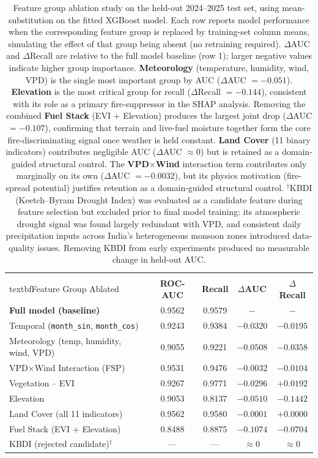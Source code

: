\documentclass[11pt]{article}
\begin{document}
\begin{table}[H]
\centering
\setlength{\tabcolsep}{5pt}
\renewcommand{\arraystretch}{1.25}
\begin{tabular}{lcccc}
\toprule
\\textbf{Feature Group Ablated} & \textbf{ROC-AUC} & \textbf{Recall} & \textbf{$\Delta$AUC} & \textbf{$\Delta$Recall} \\
\midrule
\textbf{Full model (baseline)} & 0.9562 & 0.9579 & $-$ & $-$ \\
Temporal (\texttt{month\_sin}, \texttt{month\_cos}) & 0.9243 & 0.9384 & $-0.0320$ & $-0.0195$ \\
Meteorology (temp, humidity, wind, VPD) & 0.9055 & 0.9221 & $-0.0508$ & $-0.0358$ \\
VPD$\times$Wind Interaction (FSP) & 0.9531 & 0.9476 & $-0.0032$ & $-0.0104$ \\
Vegetation -- EVI & 0.9267 & 0.9771 & $-0.0296$ & $+0.0192$ \\
Elevation & 0.9053 & 0.8137 & $-0.0510$ & $-0.1442$ \\
Land Cover (all 11 indicators) & 0.9562 & 0.9580 & $-0.0001$ & $+0.0000$ \\
Fuel Stack (EVI + Elevation) & 0.8488 & 0.8875 & $-0.1074$ & $-0.0704$ \\
\midrule
KBDI (rejected candidate)$^\dagger$ & --- & --- & $\approx 0$ & $\approx 0$ \\
\bottomrule
\end{tabular}
\caption{Feature group ablation study on the held-out 2024--2025 test set, using mean-substitution on the fitted XGBoost model. Each row reports model performance when the corresponding feature group is replaced by training-set column means, simulating the effect of that group being absent (no retraining required). $\Delta$AUC and $\Delta$Recall are relative to the full model baseline (row 1); larger negative values indicate higher group importance. \textbf{Meteorology} (temperature, humidity, wind, VPD) is the single most important group by AUC ($\Delta$AUC $= -0.051$). \textbf{Elevation} is the most critical group for recall ($\Delta$Recall $= -0.144$), consistent with its role as a primary fire-suppressor in the SHAP analysis. Removing the combined \textbf{Fuel Stack} (EVI + Elevation) produces the largest joint drop ($\Delta$AUC $= -0.107$), confirming that terrain and live-fuel moisture together form the core fire-discriminating signal once weather is held constant. \textbf{Land Cover} (11 binary indicators) contributes negligible AUC ($\Delta$AUC $\approx 0$) but is retained as a domain-guided structural control. The \textbf{VPD$\times$Wind} interaction term contributes only marginally on its own ($\Delta$AUC $= -0.0032$), but its physics motivation (fire-spread potential) justifies retention as a domain-guided structural control. $^\dagger$KBDI (Keetch--Byram Drought Index) was evaluated as a candidate feature during feature selection but excluded prior to final model training: its atmospheric drought signal was found largely redundant with VPD, and consistent daily precipitation inputs across India's heterogeneous monsoon zones introduced data-quality issues. Removing KBDI from early experiments produced no measurable change in held-out AUC.}

\end{table}
\end{document}
